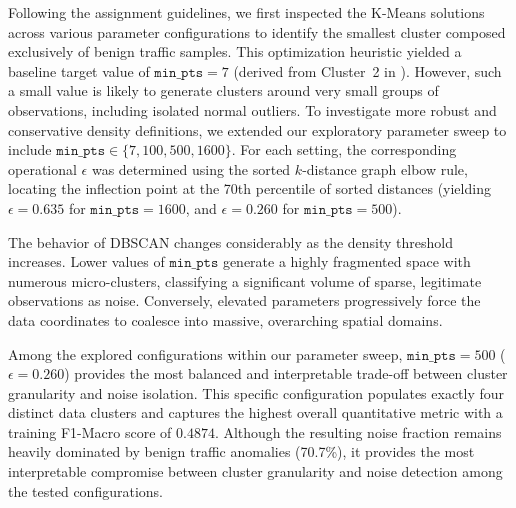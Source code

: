     Following the assignment guidelines, we first inspected the K-Means solutions across various parameter configurations to identify the smallest cluster composed exclusively of benign traffic samples. 
    This optimization heuristic yielded a baseline target value of $\texttt{min\_pts}=7$ (derived from Cluster~2 in ). 
    However, such a small value is likely to generate clusters around very small groups of observations, including isolated normal outliers. 
    To investigate more robust and conservative density definitions, we extended our exploratory parameter sweep to include $\texttt{min\_pts} \in \{7, 100, 500, 1600\}$. 
    For each setting, the corresponding operational $\epsilon$ was determined using the sorted $k$-distance graph elbow rule, locating the inflection point at the 70th percentile of sorted distances (yielding $\epsilon = 0.635$ for $\texttt{min\_pts}=1600$, and $\epsilon = 0.260$ for $\texttt{min\_pts}=500$).


    \noindent
    The behavior of DBSCAN changes considerably as the density threshold increases.
    Lower values of $\texttt{min\_pts}$ generate a highly fragmented space with numerous micro-clusters, classifying a significant volume of sparse, legitimate observations as noise. 
    Conversely, elevated parameters progressively force the data coordinates to coalesce into massive, overarching spatial domains.

    Among the explored configurations within our parameter sweep, $\texttt{min\_pts}=500$ ($\epsilon = 0.260$) provides the most balanced and interpretable trade-off between cluster granularity and noise isolation. 
    This specific configuration populates exactly four distinct data clusters and captures the highest overall quantitative metric with a training F1-Macro score of $0.4874$. 
    Although the resulting noise fraction remains heavily dominated by benign traffic anomalies (70.7\%), it provides the most interpretable compromise between cluster granularity and noise detection among the tested configurations.

